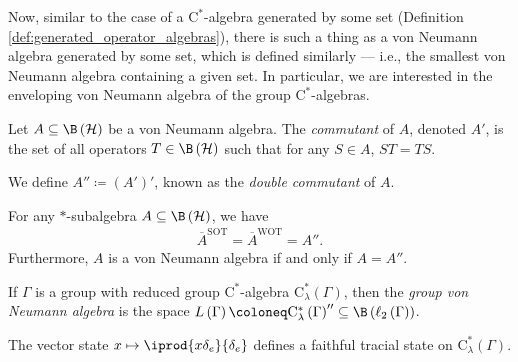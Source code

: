 Now, similar to the case of a $\mathrm{C}^{\ast}$-algebra generated by some set (Definition \ref{def:generated_operator_algebras}), there is such a thing as a von Neumann algebra generated by some set, which is defined similarly --- i.e., the smallest von Neumann algebra containing a given set. In particular, we are interested in the enveloping von Neumann algebra of the group $\mathrm{C}^{\ast}$-algebras.
\begin{definition}
  Let $A\subseteq \B\left( \mathcal{H} \right)$ be a von Neumann algebra. The \textit{commutant} of $A$, denoted $A'$, is the set of all operators $T\in \B\left( \mathcal{H} \right)$ such that for any $S\in A$, $ST = TS$.\newline

  We define $A'' \coloneq \left( A' \right)'$, known as the \textit{double commutant} of $A$.
\end{definition}
\begin{theorem}
  For any $\ast$-subalgebra $A\subseteq \B\left( \mathcal{H} \right)$, we have
  \begin{align*}
    \overline{A}^{\text{SOT}} = \overline{A}^{\text{WOT}} = A''.
  \end{align*}
  Furthermore, $A$ is a von Neumann algebra if and only if $A = A''$.
\end{theorem}
\begin{definition}
  If $\Gamma$ is a group with reduced group $\mathrm{C}^{\ast}$-algebra $\mathrm{C}^{\ast}_{\lambda}\left( \Gamma \right)$, then the \textit{group von Neumann algebra} is the space $L\left( \Gamma \right) \coloneq \mathrm{C}^{\ast}_{\lambda}\left( \Gamma \right)'' \subseteq \B\left( \ell_2\left( \Gamma \right) \right)$.
\end{definition}
\begin{proposition}
  The vector state $x\mapsto \iprod{x\delta_e}{\delta_e}$ defines a faithful tracial state on $\mathrm{C}^{\ast}_{\lambda}\left( \Gamma \right)$.
\end{proposition}
